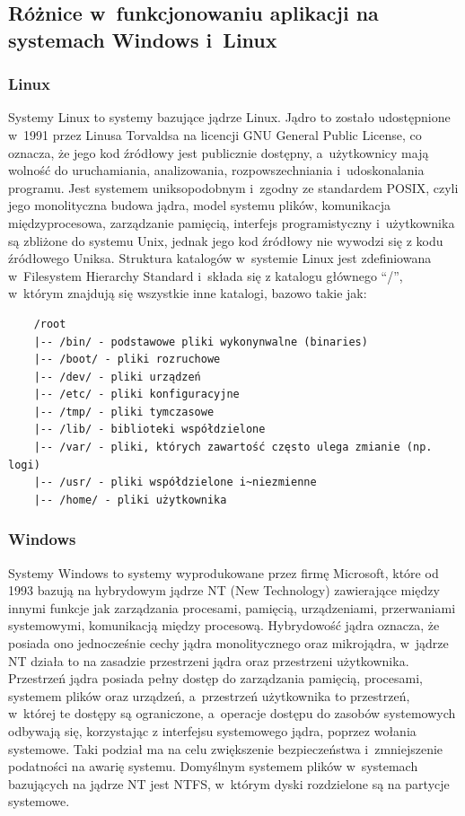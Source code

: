 \subsection{Różnice w~funkcjonowaniu aplikacji na systemach Windows i~Linux}
\subsubsection{Linux}
Systemy Linux to systemy bazujące jądrze Linux. Jądro to zostało udostępnione w~1991 przez Linusa Torvaldsa na licencji GNU General Public License, co oznacza, że jego kod źródłowy jest publicznie dostępny, a~użytkownicy mają wolność do uruchamiania, analizowania, rozpowszechniania i~udoskonalania programu.
Jest systemem uniksopodobnym i~zgodny ze standardem POSIX, czyli jego monolityczna budowa jądra, model systemu plików, komunikacja międzyprocesowa, zarządzanie pamięcią, interfejs programistyczny i~użytkownika są zbliżone do systemu Unix, jednak jego kod źródłowy nie wywodzi się z kodu źródłowego Uniksa. Struktura katalogów w~systemie Linux jest zdefiniowana w~Filesystem Hierarchy Standard \cite{linuxFhs} i~składa się z katalogu głównego “/”, w~którym znajdują się wszystkie inne katalogi, bazowo takie jak:
\begin{verbatim}
    /root
    |-- /bin/ - podstawowe pliki wykonynwalne (binaries)
    |-- /boot/ - pliki rozruchowe
    |-- /dev/ - pliki urządzeń
    |-- /etc/ - pliki konfiguracyjne
    |-- /tmp/ - pliki tymczasowe
    |-- /lib/ - biblioteki współdzielone
    |-- /var/ - pliki, których zawartość często ulega zmianie (np. logi)
    |-- /usr/ - pliki współdzielone i~niezmienne
    |-- /home/ - pliki użytkownika
\end{verbatim}

\subsubsection{Windows}
Systemy Windows to systemy wyprodukowane przez firmę Microsoft, które od 1993 bazują na hybrydowym jądrze\cite{windowsHybridKernel} NT (New Technology)\cite{windowsNT} zawierające między innymi funkcje jak zarządzania procesami, pamięcią, urządzeniami, przerwaniami systemowymi, komunikacją między procesową. Hybrydowość jądra oznacza, że posiada ono jednocześnie cechy jądra monolitycznego oraz mikrojądra, w~jądrze NT działa to na zasadzie przestrzeni jądra oraz przestrzeni użytkownika. Przestrzeń jądra posiada pełny dostęp do zarządzania pamięcią, procesami, systemem plików oraz urządzeń, a~przestrzeń użytkownika to przestrzeń, w~której te dostępy są ograniczone, a~operacje dostępu do zasobów systemowych odbywają się, korzystając z interfejsu systemowego jądra, poprzez wołania systemowe. Taki podział ma na celu zwiększenie bezpieczeństwa i~zmniejszenie podatności na awarię systemu. Domyślnym systemem plików w~systemach bazujących na jądrze NT jest NTFS, w~którym dyski rozdzielone są na partycje systemowe.

